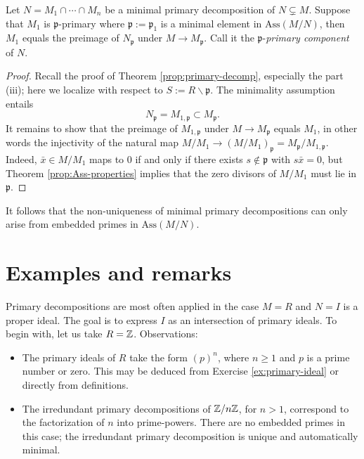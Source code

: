 \begin{corollary}\label{prop:p-primary-component}
	Let $N = M_1 \cap \cdots \cap M_n$ be a minimal primary decomposition of $N \subsetneq M$. Suppose that $M_1$ is $\mathfrak{p}$-primary where $\mathfrak{p} := \mathfrak{p}_1$ is a minimal element in $\text{Ass}(M/N)$, then $M_1$ equals the preimage of $N_{\mathfrak{p}}$ under $M \to M_{\mathfrak{p}}$. Call it the $\mathfrak{p}$-\emph{primary component} of $N$.
\end{corollary}
\begin{proof}
	Recall the proof of Theorem \ref{prop:primary-decomp}, especially the part (iii); here we localize with respect to $S := R \smallsetminus \mathfrak{p}$. The minimality assumption entails
	\[ N_{\mathfrak{p}} = M_{1, \mathfrak{p}} \subset M_{\mathfrak{p}}. \]
	It remains to show that the preimage of $M_{1, \mathfrak{p}}$ under $M \to M_{\mathfrak{p}}$ equals $M_1$, in other words the injectivity of the natural map $M/M_1 \to (M/M_1)_{\mathfrak{p}} = M_{\mathfrak{p}}/M_{1, \mathfrak{p}}$. Indeed, $\bar{x} \in M/M_1$ maps to $0$ if and only if there exists $s \notin \mathfrak{p}$ with $s\bar{x}=0$, but Theorem \ref{prop:Ass-properties} implies that the zero divisors of $M/M_1$ must lie in $\mathfrak{p}$.
\end{proof}

It follows that the non-uniqueness of minimal primary decompositions can only arise from embedded primes in $\text{Ass}(M/N)$.

\section{Examples and remarks}
Primary decompositions are most often applied in the case $M = R$ and $N = I$ is a proper ideal. The goal is to express $I$ as an intersection of primary ideals. To begin with, let us take $R = \mathbb{Z}$. Observations:
\begin{itemize}
	\item The primary ideals of $R$ take the form $(p)^n$, where $n \geq 1$ and $p$ is a prime number or zero. This may be deduced from Exercise \ref{ex:primary-ideal} or directly from definitions.
	\item The irredundant primary decompositions of $\mathbb{Z}/n\mathbb{Z}$, for $n > 1$, correspond to the factorization of $n$ into prime-powers. There are no embedded primes in this case; the irredundant primary decomposition is unique and automatically minimal.
\end{itemize}

